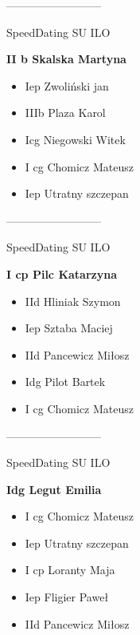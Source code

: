 \documentclass[a4paper,10pt]{article}
\begin{document}
\begin{multicols}{3}
\begin{minipage}[l]{\textwidth}
\begin{itemize}
    \end{itemize}



\end{minipage}



\begin{minipage}[l]{\textwidth}
--------------------------

  \footnotesize{SpeedDating SU ILO}

  \bfseries{II b Skalska Martyna}

  \begin{itemize}
    \item Iep Zwoliński jan
    \item IIIb Plaza Karol
    \item Icg Niegowski Witek
    \item I cg Chomicz Mateusz
    \item Iep Utratny szczepan

    \end{itemize}



\end{minipage}



\begin{minipage}[l]{\textwidth}
--------------------------

  \footnotesize{SpeedDating SU ILO}

  \bfseries{I cp Pilc Katarzyna}

  \begin{itemize}
    \item IId Hliniak Szymon
    \item Iep Sztaba Maciej
    \item IId Pancewicz Miłosz
    \item Idg Pilot Bartek
    \item I cg Chomicz Mateusz

    \end{itemize}



\end{minipage}



\begin{minipage}[l]{\textwidth}
--------------------------

  \footnotesize{SpeedDating SU ILO}

  \bfseries{Idg Legut Emilia}

  \begin{itemize}
    \item I cg Chomicz Mateusz
    \item Iep Utratny szczepan
    \item I cp Loranty Maja
    \item Iep Fligier Paweł
    \item IId Pancewicz Miłosz


\end{itemize}
\end{minipage}
\end{multicols}
\end{document}
